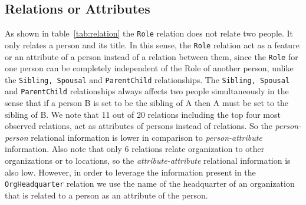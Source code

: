 \documentclass[paper=a4,fontsize=11pt]{scrartcl}
\newcommand{\tabref}[1]{table~\ref{#1}}
\numberwithin{equation}{section}    %
\numberwithin{figure}{section}      %
\numberwithin{table}{section}       %
\begin{document}
\subsection{Relations or Attributes}
\label{sec:relat-or-attr}
As shown in \tabref{tab:relation} the \texttt{Role} relation does not relate two people.
It only relates a person and its title.
In this sense, the \texttt{Role} relation act as a feature or an attribute of a person
instead of a relation between them, since the \texttt{Role} for one person can be completely
independent of the Role of another person, unlike the \texttt{Sibling, Spousal} and \texttt{ParentChild}
relationships. The \texttt{Sibling, Spousal} and \texttt{ParentChild} relationships always affects two
people simultaneously in the sense that if a person \textsc{B} is set to be the sibling of \textsc{A} then
\textsc{A} must be set to the sibling of \textsc{B}.
We note that 11 out of 20 relations including the top four most observed relations,
act as attributes of persons instead of relations. So the \textit{person-person} relational
information is lower in comparison to \textit{person-attribute} information.
Also note that only 6 relations relate organization to other organizations or
to locations, so the \textit{attribute-attribute} relational information is
also low. However, in order to leverage the information present in the
\texttt{OrgHeadquarter} relation we use the name of the headquarter of an
organization that is related to a person as an attribute of the person.
\end{document}
